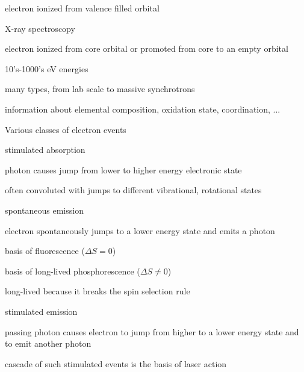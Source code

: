 \documentclass[11pt]{article}
\begin{document}
\begin{outline}
\begin{outline}
\begin{outline}
\begin{outline}
        \item electron ionized from valence filled orbital          
        \end{outline}
      \item X-ray spectroscopy
        \begin{outline}
        \item electron ionized from core orbital or promoted from core to an empty orbital 
        \item 10’s-1000’s eV energies
        \item many types, from lab scale to massive synchrotrons
        \item information about elemental composition, oxidation state, coordination, ...          
        \end{outline}
      \end{outline}

    \item Various classes of electron events
      \begin{outline}
      \item stimulated absorption
        \begin{outline}
        \item photon causes jump from lower to higher energy electronic state
        \item often convoluted with jumps to different vibrational, rotational states          
        \end{outline}
      \item spontaneous emission
        \begin{outline}
        \item electron spontaneously jumps to a lower energy state and emits a photon
        \item basis of fluorescence ($\Delta S = 0$)
        \item basis of long-lived phosphorescence ($\Delta S \neq  0$)
        \item long-lived because it breaks the spin selection rule
        \end{outline}
      \item stimulated emission
        \begin{outline}
        \item passing photon causes electron to jump from higher to a lower energy state and to emit another photon
        \item cascade of such stimulated events is the basis of laser action
        \end{outline}
      \end{outline}
    \end{outline}


\end{outline}
\end{document}

